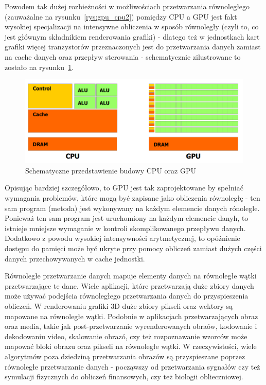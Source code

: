 Powodem tak dużej rozbieżności w możliwościach przetwarzania równoległego (zauważalne na rysunku~\ref{rys:gpu_cpu2}) pomiędzy CPU a GPU jest fakt wysokiej specjalizacji na intensywne obliczenia w sposób równoległy (czyli to, co jest głównym składnikiem renderowania grafiki) - dlatego też w jednostkach kart grafiki więcej tranzystorów przeznaczonych jest do przetwarzania danych zamiast na cache danych oraz przepływ sterowania - schematycznie zilustrowane to zostało na rysunku~\ref{rys:gpu_cpu_trans}.

\begin{figure}[h]
\centering\includegraphics[width=1.0\textwidth]{figures/03/gpu_cpu_trans.png}
\caption{Schematyczne przedstawienie budowy CPU oraz GPU~\cite{Cuda:PGuide}}\label{rys:gpu_cpu_trans}
\end{figure}

Opisując bardziej szczegółowo, to GPU jest tak zaprojektowane by spełniać wymagania problemów, które mogą być zapisane jako obliczenia równoległę - ten sam program (metoda) jest wykonywany na każdym elemencie danych rónolegle. Ponieważ ten sam program jest uruchomiony na każdym elemencie danyh, to istnieje mniejsze wymaganie w kontroli skomplikowanego przepływu danych. Dodatkowo z powodu wysokiej intensywności arytmetycznej, to opóźnienie dostępu do pamięci może być ukryte przy pomocy obliczeń zamiast dużych części danych przechowywanych w cache jednostki.

Równoległe przetwarzanie danych mapuje elementy danych na równoległe wątki przetwarzające te dane. Wiele aplikacji, które przetwarzają duże zbiory danych może używać podejścia równoległego przetwarzania danych do przyspieszenia obliczeń. W renderowaniu grafiki 3D duże zbiory pikseli oraz wektory są mapowane na równoległe wątki. Podobnie w aplikacjach przetwarzających obraz oraz media, takie jak post-przetwarzanie wyrenderowanych obraów, kodowanie i  dekodowaniu video, skalowanie obrazó, czy też rozpoznawanie wzorców może mapować bloki obrazu oraz pikseli na równoległe wątki. W rzeczywistości, wiele algorytmów poza dziedziną przetwarzania obrazów są przyspieszane poprzez równoległe przetwarzanie danych - począwszy od przetwarzania sygnałów czy też symulacji fizycznych do obliczeń finansowych, czy też biologii oblieczniowej.


